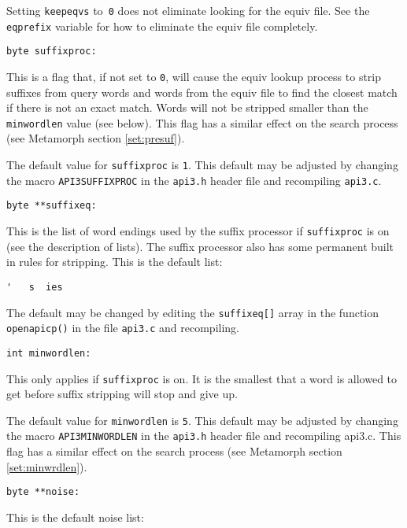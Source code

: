 Setting \verb`keepeqvs` to\verb` 0` does not eliminate looking for the equiv
file.  See the \verb`eqprefix` variable for how to eliminate the equiv
file completely.

\begin{verbatim}
byte suffixproc:
\end{verbatim}
This is a flag that, if not set to \verb`0`, will cause the equiv lookup
process to strip suffixes from query words and words from the
equiv file to find the closest match if there is not an exact
match.  Words will not be stripped smaller than the \verb`minwordlen`
value (see below).  This flag has a similar effect on the search
process (see Metamorph section \ref{set:presuf}).

The default value for \verb`suffixproc` is \verb`1`. This default may be
adjusted by changing the macro \verb`API3SUFFIXPROC` in the \verb`api3.h` header
file and recompiling \verb`api3.c`.

\begin{verbatim}
byte **suffixeq:
\end{verbatim}
This is the list of word endings used by the suffix processor if
\verb`suffixproc` is on (see the description of lists).  The suffix
processor also has some permanent built in rules for stripping.
This is the default list:

\begin{verbatim}
'   s  ies
\end{verbatim}

The default may be changed by editing the \verb`suffixeq[]` array in the
function \verb`openapicp()` in the file \verb`api3.c` and recompiling.

\begin{verbatim}
int minwordlen:
\end{verbatim}
This only applies if \verb`suffixproc` is on.  It is the smallest that a
word is allowed to get before suffix stripping will stop and give
up.

The default value for \verb`minwordlen` is \verb`5`. This default may be
adjusted by changing the macro \verb`API3MINWORDLEN` in the \verb`api3.h` header
file and recompiling api3.c.  This flag has a similar effect on
the search process (see Metamorph section \ref{set:minwrdlen}).

\begin{verbatim}
byte **noise:
\end{verbatim}
This is the default noise list:

